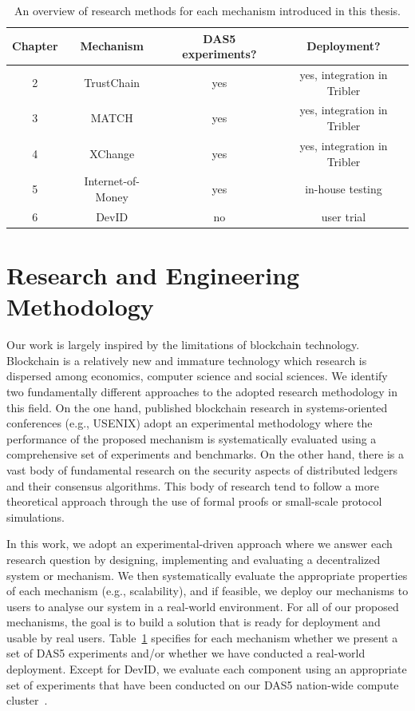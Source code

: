 \begin{table}[t]
	\small
	\centering
	\begin{tabular}{ |c|c|c|c| }
		\hline
		\textbf{Chapter} & \textbf{Mechanism} & \textbf{DAS5 experiments?} & \textbf{Deployment?} \\ \hline
		2 & TrustChain & yes & yes, integration in Tribler \\ \hline
		3 & MATCH & yes & yes, integration in Tribler \\ \hline
		4 & XChange & yes & yes, integration in Tribler \\ \hline
		5 & Internet-of-Money & yes & in-house testing \\ \hline
		6 & DevID & no & user trial \\ \hline
	\end{tabular}
	\caption{An overview of research methods for each mechanism introduced in this thesis.}
	\label{table:research_methodology}
\end{table}

\section{Research and Engineering Methodology}
Our work is largely inspired by the limitations of blockchain technology.
Blockchain is a relatively new and immature technology which research is dispersed among economics, computer science and social sciences.
We identify two fundamentally different approaches to the adopted research methodology in this field.
On the one hand, published blockchain research in systems-oriented conferences (e.g., USENIX) adopt an experimental methodology where the performance of the proposed mechanism is systematically evaluated using a comprehensive set of experiments and benchmarks.
On the other hand, there is a vast body of fundamental research on the security aspects of distributed ledgers and their consensus algorithms.
This body of research tend to follow a more theoretical approach through the use of formal proofs or small-scale protocol simulations.

In this work, we adopt an experimental-driven approach where we answer each research question by designing, implementing and evaluating a decentralized system or mechanism.
We then systematically evaluate the appropriate properties of each mechanism (e.g., scalability), and if feasible, we deploy our mechanisms to users to analyse our system in a real-world environment.
For all of our proposed mechanisms, the goal is to build a solution that is ready for deployment and usable by real users.
Table~\ref{table:research_methodology} specifies for each mechanism whether we present a set of DAS5 experiments and/or whether we have conducted a real-world deployment.
Except for DevID, we evaluate each component using an appropriate set of experiments that have been conducted on our DAS5 nation-wide compute cluster~\cite{bal2016medium}.


